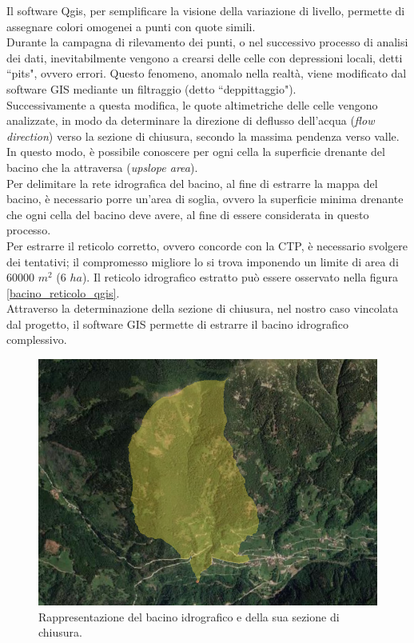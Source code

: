 \noindent Il software Qgis, per semplificare la visione della variazione di livello, permette di assegnare colori omogenei a punti con quote simili.\\ 
Durante la campagna di rilevamento dei punti, o nel successivo processo di analisi dei dati, inevitabilmente vengono a crearsi delle celle con depressioni locali, detti ``pits", ovvero errori. Questo fenomeno, anomalo nella realtà, viene modificato dal software GIS mediante un filtraggio (detto ``deppittaggio").\\
Successivamente a questa modifica, le quote altimetriche delle celle vengono analizzate, in modo da determinare la direzione di deflusso dell'acqua (\textit{flow direction}) verso la sezione di chiusura, secondo la massima pendenza verso valle.\\
In questo modo, è possibile conoscere per ogni cella la superficie drenante del bacino che la attraversa (\textit{upslope area}).\\
Per delimitare la rete idrografica del bacino, al fine di estrarre la mappa del bacino, è necessario porre un'area di soglia, ovvero la superficie minima drenante che ogni cella del bacino deve avere, al fine di essere considerata in questo processo.\\
Per estrarre il reticolo corretto, ovvero concorde con la CTP, è necessario svolgere dei tentativi; il compromesso migliore lo si trova imponendo un limite di area di 60000 $m^2$ (6 $ha$). Il reticolo idrografico estratto può essere osservato nella figura \ref{bacino_reticolo_qgis}.\\
Attraverso la determinazione della sezione di chiusura, nel nostro caso vincolata dal progetto, il software GIS permette di estrarre il bacino idrografico complessivo.\\
\begin{figure}[H]\centering
    \includegraphics[scale=.50]{immagini/bacino_qgis.PNG}
    \caption{Rappresentazione del bacino idrografico e della sua sezione di chiusura.}
    \label{bacino_qgis}
\end{figure}
